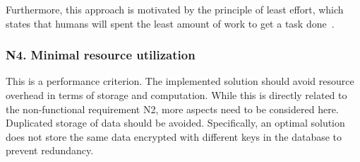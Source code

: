 \documentclass[../main.tex]{subfiles}
\begin{document}
Furthermore, this approach is motivated by the principle of least effort, which states that humans will spent the least amount of work to get a task done~\cite{Levenson2018}.


\subsubsection{N4. Minimal resource utilization}
This is a performance criterion.
The implemented solution should avoid resource overhead in terms of storage and computation.
While this is directly related to the non-functional requirement N2, more aspects need to be considered here.
Duplicated storage of data should be avoided.
Specifically, an optimal solution does not store the same data encrypted with different keys in the database to prevent redundancy.
\end{document}
